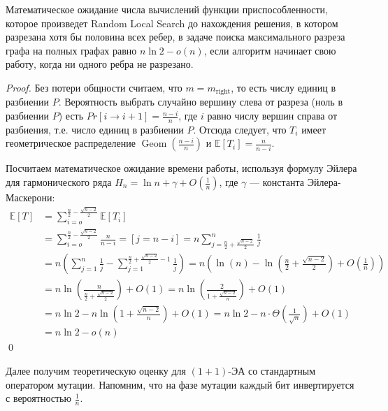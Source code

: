 \documentclass[times]{itmo-student-thesis}
\newcommand{\oea}{\mbox{$(1 + 1)$-ЭА}\xspace}
\DeclareMathOperator{\Geom}{Geom}
\begin{document}
\begin{theorem} \label{thm:rls}
  Математическое ожидание числа вычислений функции приспособленности, которое произведет Random Local Search до нахождения решения, в котором разрезана хотя бы половина всех ребер, в задаче поиска максимального разреза графа на полных графах равно $n\ln 2 - o(n)$, если алгоритм начинает свою работу, когда ни одного ребра не разрезано.
\end{theorem}

\begin{proof}
  Без потери общности считаем, что $m = m_{\text{right}}$, то есть числу единиц в разбиении $P$.
  Вероятность выбрать случайно вершину слева от разреза (ноль в разбиении $P$) есть $Pr[i \rightarrow i + 1] = \frac{n-i}{n}$, где $i$ равно числу вершин справа от разбиения, т.е. число единиц в разбиении $P$.
  Отсюда следует, что  $T_i$ имеет геометрическое распределение $\Geom(\frac{n-i}{n})$ и $\mathbb{E}[T_i] = \frac{n}{n-i}$.

  Посчитаем математическое ожидание времени работы, используя формулу Эйлера для гармонического ряда $H_n = \ln n + \gamma + O(\frac{1}{n})$, где $\gamma$ --- константа Эйлера-Маскерони:
  \begin{align*}
      \mathbb{E}[T] &=
                  \sum_{i=o}^{\frac{n}{2} - \frac{\sqrt{n-2}}{2}} \mathbb{E}[T_i] \\
          &=
                  \sum_{i=o}^{\frac{n}{2} - \frac{\sqrt{n-2}}{2}} \frac{n}{n-i} = [j = n - i] = n \sum_{j=\frac{n}{2} + \frac{\sqrt{n-2}}{2}}^{n} \frac{1}{j}  \\
          &=      n \left(\sum_{j=1}^{n}\frac{1}{j} - \sum_{j=1}^{\frac{n}{2} +  \frac{\sqrt{n-2}}{2} - 1} \frac{1}{j} \right) =
                  n\left(\ln(n) - \ln\left(\frac{n}{2} + \frac{\sqrt{n-2}}{2}\right) + O\left(\frac{1}{n}\right) \right) \\
          &=
                  n \ln\left(\frac{n}{\frac{n}{2} + \frac{\sqrt{n-2}}{2}}\right) + O(1) = n \ln\left(\frac{2}{1 + \frac{\sqrt{n-2}}{n}}\right) + O(1) \\
          &= n\ln2 - n\ln\left(1 + \frac{\sqrt{n-2}}{n}\right) + O(1) = n\ln2 - n\cdot\Theta\left(\frac{1}{\sqrt{n}}\right) + O(1) \\
          &= n\ln2 - o(n)
  \end{align*}
  \qed
\end{proof}

Далее получим теоретическую оценку для \oea со стандартным оператором мутации. Напомним, что  на фазе мутации каждый бит инвертируется с вероятностью $\frac{1}{n}$.
\end{document}
